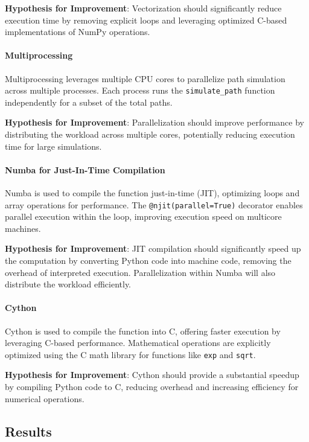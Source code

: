 \documentclass[12pt,a4paper]{report}
\begin{document}
\textbf{Hypothesis for Improvement}: Vectorization should significantly reduce execution time by removing explicit loops and leveraging optimized C-based implementations of NumPy operations.

\paragraph{Multiprocessing}  
Multiprocessing leverages multiple CPU cores to parallelize path simulation across multiple processes. Each process runs the \texttt{simulate\_path} function independently for a subset of the total paths.

\textbf{Hypothesis for Improvement}: Parallelization should improve performance by distributing the workload across multiple cores, potentially reducing execution time for large simulations.

\paragraph{Numba for Just-In-Time Compilation}  
Numba is used to compile the function just-in-time (JIT), optimizing loops and array operations for performance. The \texttt{@njit(parallel=True)} decorator enables parallel execution within the loop, improving execution speed on multicore machines.

\textbf{Hypothesis for Improvement}: JIT compilation should significantly speed up the computation by converting Python code into machine code, removing the overhead of interpreted execution. Parallelization within Numba will also distribute the workload efficiently.

\paragraph{Cython}  
Cython is used to compile the function into C, offering faster execution by leveraging C-based performance. Mathematical operations are explicitly optimized using the C math library for functions like \texttt{exp} and \texttt{sqrt}.

\textbf{Hypothesis for Improvement}: Cython should provide a substantial speedup by compiling Python code to C, reducing overhead and increasing efficiency for numerical operations.

\subsection{Results}
\end{document}
